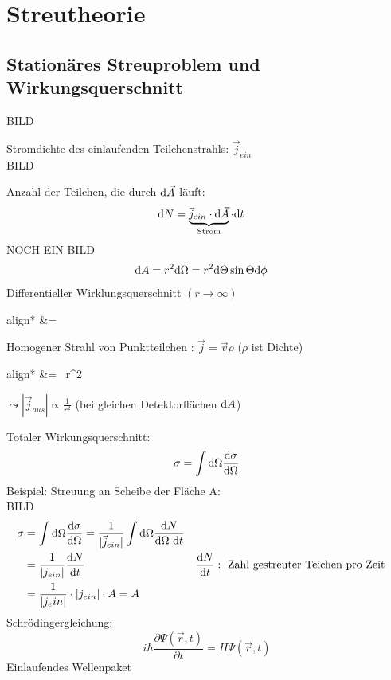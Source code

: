 \section{Streutheorie}
	\subsection{Stationäres Streuproblem und Wirkungsquerschnitt}
	BILD
		
	Stromdichte des einlaufenden Teilchenstrahls: $\vec{j}_{ein}$
	\\
	BILD
	
	Anzahl der Teilchen, die durch $\mathrm{d} \vec{A}$ läuft:
		\begin{align*}
			\diff N &= 
			\underbrace{\vec{j}_{ein} \cdot \diff \vec{A}}_{\mathclap{\text{Strom}}}
			\cdot \diff t
		\end{align*}
	NOCH EIN BILD
		\begin{align*}
			\mathrm{d} A &= r^2 \mathrm{d} \Omega = r^2 \mathrm{d} \Theta \sin \Theta \mathrm{d} \phi
		\end{align*}
	Differentieller Wirklungsquerschnitt $(r \rightarrow \infty)$
		\begin{empheq}[box=\boxed]{align*}
			\frac{\diff \sigma}{\diff \Omega} &=
			 
		\end{empheq}
	Homogener Strahl von Punktteilchen : $\vec{j} = \vec{v} \rho$ ($\rho$ ist Dichte)
		\begin{empheq}[box=\boxed]{align*}
			\frac{\diff \sigma}{\diff \Omega} &=
			 ~r^2
		\end{empheq}
	$ \leadsto |\vec{j}_{aus}| \propto \frac{1}{r^2}$ (bei gleichen Detektorflächen $\mathrm{d} A$)
	
	Totaler Wirkungsquerschnitt:
		\begin{align*}
			\sigma = \int \mathrm{d} \Omega \frac{\mathrm{d} \sigma}{\mathrm{d} \Omega}
		\end{align*}
	Beispiel: Streuung an Scheibe der Fläche A:
	\\
	BILD
	\\
		\begin{align*}
			\sigma &= \int \mathrm{d} \Omega \frac{\mathrm{d} \sigma}{\mathrm{d} \Omega}
			= \frac{1}{|\vec{j}_{ein}|} \int \mathrm{d} \Omega \frac{\mathrm{d} N}{\mathrm{d} \Omega ~\mathrm{d} t}\\
			&= \frac{1}{|j_{ein}|} \frac{\mathrm{d} N}{\mathrm{d} t} & &\frac{\mathrm{d} N}{\mathrm{d} t}: 
			\text{~Zahl gestreuter Teichen pro Zeit} \\
			&= \frac{1}{|j_ein|} \cdot |j_{ein}| \cdot A = A
		\end{align*}
	Schrödingergleichung: 
		\begin{equation*}
			i \hbar \frac{\partial \Psi (\vec{r}, t)}{\partial t} = H \Psi (\vec{r} , t) 
		\end{equation*}
	Einlaufendes Wellenpaket
	
